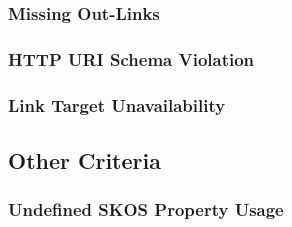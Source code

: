 \subsubsection{Missing Out-Links}

\subsubsection{HTTP URI Schema Violation}

\subsubsection{Link Target Unavailability}



\subsection{Other Criteria}

\subsubsection{Undefined SKOS Property Usage}




